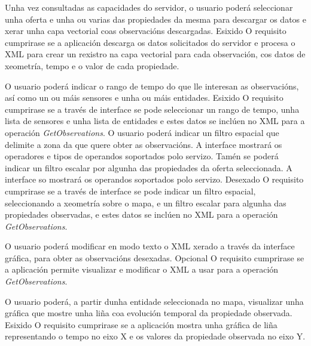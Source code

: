 		  	{Unha vez consultadas as capacidades do servidor, o usuario poderá seleccionar unha oferta e unha ou varias das propiedades da mesma para descargar os datos e xerar unha capa vectorial coas observacións descargadas.}%
			{Esixido}%
			{O requisito cumprirase se a aplicación descarga os datos solicitados do servidor e procesa o XML para crear un rexistro na capa vectorial para cada observación, cos datos de xeometría, tempo e o valor de cada propiedade.}%
			
		  	{O usuario poderá indicar o rango de tempo do que lle interesan as observacións, así como un ou máis sensores e unha ou máis entidades.}%
			{Esixido}%
			{O requisito cumprirase se a través de interface se pode seleccionar un rango de tempo, unha lista de sensores e unha lista de entidades e estes datos se inclúen no XML para a operación \emph{GetObservations}.}%
\newpage			
{}
		  	{O usuario poderá indicar un filtro espacial que delimite a zona da que quere obter as observacións. A interface mostrará os operadores e tipos de operandos soportados polo servizo. Tamén se poderá indicar un filtro escalar por algunha das propiedades da oferta seleccionada. A interface so mostrará os operandos soportados polo servizo.}%
			{Desexado}%
			{O requisito cumprirase se a través de interface se pode indicar un filtro espacial, seleccionando a xeometría sobre o mapa, e un filtro escalar para algunha das propiedades observadas, e estes datos se inclúen no XML para a operación \emph{GetObservations}.}%
			
		  	{O usuario poderá modificar en modo texto o XML xerado a través da interface gráfica,  para obter as observacións desexadas.}%
			{Opcional}%
			{O requisito cumprirase se a aplicación permite visualizar e modificar o XML a usar para a operación \emph{GetObservations}.}%
			
		  	{O usuario poderá, a partir dunha entidade seleccionada no mapa, visualizar unha gráfica que mostre unha liña coa evolución temporal da propiedade observada.}%
			{Esixido}%
			{O requisito cumprirase se a aplicación mostra unha gráfica de liña representando o tempo no eixo X e os valores da propiedade observada no eixo Y.}%
			
